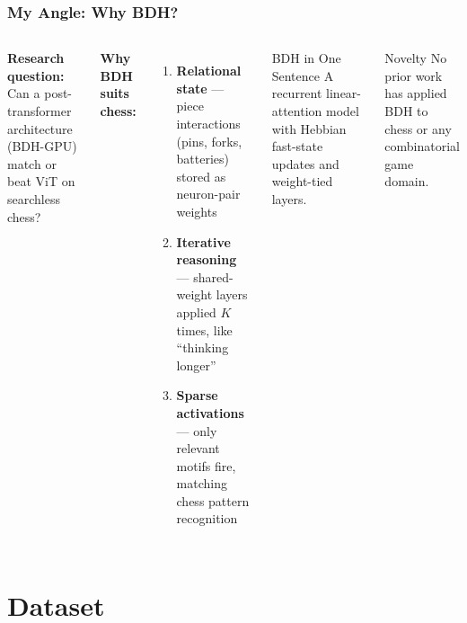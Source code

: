 \documentclass{beamer}
\begin{document}
\begin{frame}
\frametitle{My Angle: Why BDH?}

\begin{columns}
\textbf{Research question:}\\
Can a \alert{post-transformer} architecture (BDH-GPU) match or beat ViT on searchless chess?

\vspace{1em}
\textbf{Why BDH suits chess:}
\begin{enumerate}
    \item \textbf{Relational state} --- piece interactions (pins, forks, batteries) stored as neuron-pair weights
    \item \textbf{Iterative reasoning} --- shared-weight layers applied $K$ times, like ``thinking longer''
    \item \textbf{Sparse activations} --- only relevant motifs fire, matching chess pattern recognition
\end{enumerate}

\begin{block}{BDH in One Sentence}
A recurrent linear-attention model with \alert{Hebbian fast-state updates} and \alert{weight-tied layers}.
\end{block}

\vspace{0.5em}
\begin{alertblock}{Novelty}
No prior work has applied BDH to chess or any combinatorial game domain.
\end{alertblock}
\end{columns}

\end{frame}

\section{Dataset}
\end{document}
